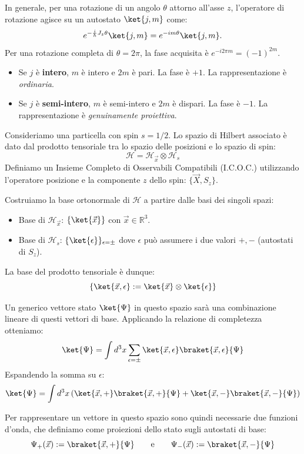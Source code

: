 In generale, per una rotazione di un angolo \(\theta\) attorno all'asse \(z\), l'operatore di rotazione agisce su un autostato \(\ket{j,m}\) come:
\[
    e^{-\frac{i}{\hbar}J_z \theta} \ket{j,m} = e^{-i m \theta} \ket{j,m}.
\]
Per una rotazione completa di \(\theta = 2\pi\), la fase acquisita è \(e^{-i 2\pi m} = (-1)^{2m}\).
\begin{itemize}
    \item Se \(j\) è \textbf{intero}, \(m\) è intero e \(2m\) è pari. La fase è \(+1\). La rappresentazione è \textit{ordinaria}.
    \item Se \(j\) è \textbf{semi-intero}, \(m\) è semi-intero e \(2m\) è dispari. La fase è \(-1\). La rappresentazione è \textit{genuinamente proiettiva}.
\end{itemize}



Consideriamo una particella con spin \( s=1/2 \). Lo spazio di Hilbert associato è dato dal prodotto tensoriale tra lo spazio delle posizioni e lo spazio di spin:
\[
    \mathcal{H} = \mathcal{H}_{\vec{x}} \otimes \mathcal{H}_s
\]
Definiamo un Insieme Completo di Osservabili Compatibili (I.C.O.C.) utilizzando l'operatore posizione e la componente \( z \) dello spin: \( \{ \vec{X}, S_z \} \).

Costruiamo la base ortonormale di \( \mathcal{H} \) a partire dalle basi dei singoli spazi:
\begin{itemize}
    \item Base di \( \mathcal{H}_{\vec{x}} \): \( \{ \ket{\vec{x}} \} \) con \( \vec{x} \in \mathbb{R}^3 \).
    \item Base di \( \mathcal{H}_s \): \( \{ \ket{\epsilon} \}_{\epsilon=\pm} \) dove \( \epsilon \) può assumere i due valori \( +, - \) (autostati di \( S_z \)).
\end{itemize}

La base del prodotto tensoriale è dunque:
\[
    \{ \ket{\vec{x}, \epsilon} := \ket{\vec{x}} \otimes \ket{\epsilon} \}
\]

Un generico vettore stato \( \ket{\Psi} \) in questo spazio sarà una combinazione lineare di questi vettori di base. Applicando la relazione di completezza otteniamo:
\[
    \ket{\Psi} = \int d^3x \sum_{\epsilon=\pm} \ket{\vec{x}, \epsilon} \braket{\vec{x}, \epsilon}{\Psi}
\]
Espandendo la somma su \( \epsilon \):
\[
    \ket{\Psi} = \int d^3x \left( \ket{\vec{x}, +}\braket{\vec{x}, +}{\Psi} + \ket{\vec{x}, -}\braket{\vec{x}, -}{\Psi} \right)
\]

Per rappresentare un vettore in questo spazio sono quindi necessarie due funzioni d'onda, che definiamo come proiezioni dello stato sugli autostati di base:
\[
    \Psi_+(\vec{x}) := \braket{\vec{x}, +}{\Psi} \qquad \text{e} \qquad \Psi_-(\vec{x}) := \braket{\vec{x}, -}{\Psi}
\]

